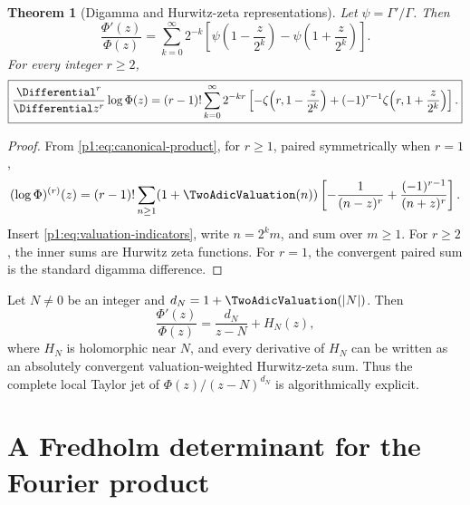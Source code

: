 \documentclass[11pt]{article}
\newtheorem{theorem}{Theorem}[section]
\theoremstyle{definition}
\theoremstyle{remark}
\begin{document}
\begin{theorem}[Digamma and Hurwitz-zeta representations]\label{p1:thm:hurwitz}
Let \(\psi=\Gamma'/\Gamma\).  Then
\begin{equation}
 \boxed{
 \frac{\Phi'(z)}{\Phi(z)}
 =\sum_{k=0}^{\infty}2^{-k}
 \left[
 \psi\!\left(1-\frac{z}{2^k}\right)
 -\psi\!\left(1+\frac{z}{2^k}\right)
 \right].
 }                                                           \label{p1:eq:logder-digamma}
\end{equation}
For every integer \(r\ge2\),
\begin{equation}
 \boxed{
 \frac{\Differential^r}{\Differential z^r}\log\Phi(z)
 =(r-1)!\sum_{k=0}^{\infty}2^{-kr}
 \left[
 -\zeta\!\left(r,1-\frac{z}{2^k}\right)
 +(-1)^{r-1}\zeta\!\left(r,1+\frac{z}{2^k}\right)
 \right].
 }                                                           \label{p1:eq:logder-hurwitz}
\end{equation}
\end{theorem}

\begin{proof}
From \eqref{p1:eq:canonical-product}, for \(r\ge1\), paired symmetrically when \(r=1\),
\begin{equation}
 (\log\Phi)^{(r)}(z)
 =(r-1)!\sum_{n\ge1}(1+\TwoAdicValuation(n))
 \left[-\frac1{(n-z)^r}+\frac{(-1)^{r-1}}{(n+z)^r}\right].   \label{p1:eq:logder-general-zero}
\end{equation}
Insert \eqref{p1:eq:valuation-indicators}, write \(n=2^k m\), and sum over \(m\ge1\).
For \(r\ge2\), the inner sums are Hurwitz zeta functions.  For \(r=1\), the convergent
paired sum is the standard digamma difference.
\end{proof}

\begin{corollary}
Let \(N\ne0\) be an integer and \(d_N=1+\TwoAdicValuation(|N|)\).  Then
\begin{equation}
 \frac{\Phi'(z)}{\Phi(z)}=\frac{d_N}{z-N}+H_N(z),             \label{p1:eq:local-logder-zero}
\end{equation}
where \(H_N\) is holomorphic near \(N\), and every derivative of \(H_N\) can be written
as an absolutely convergent valuation-weighted Hurwitz-zeta sum.  Thus the complete local
Taylor jet of \(\Phi(z)/(z-N)^{d_N}\) is algorithmically explicit.
\end{corollary}

\section{A Fredholm determinant for the Fourier product}\label{p1:sec:fredholm}
\end{document}
